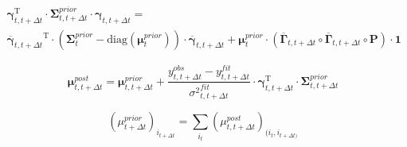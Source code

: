 \documentclass[pdflatex,sn-mathphys-num]{sn-jnl}%
\theoremstyle{thmstyleone}%
\theoremstyle{thmstyletwo}%
\theoremstyle{thmstylethree}%
\begin{document}
\begin{multline}
	{\mathbf \gamma}^{\mathrm{T}}_{t, t+\Delta t} \cdot \mathbf \Sigma^{prior}_{t, t+\Delta t} \cdot \mathbf \gamma_{t, t+\Delta t}= \\
	{\overline {\mathbf \gamma}_{t, t+\Delta t}}^\mathrm{T} \cdot 
	(\mathbf \Sigma^{prior}_{t} -\mathrm{diag}( \mathbf \mu^{prior}_t))\cdot  
	{\overline {\mathbf \gamma}_{t, t+\Delta t}}+ 
	\mathbf \mu^{prior}_t \cdot ( \overline {\mathbf \Gamma}_{t, t + \Delta t}  \circ  \overline {\mathbf \Gamma}_{t, t + \Delta t}  \circ \mathbf P ) \cdot \mathbf 1
\end{multline}

\begin{equation}
	\mathbf \mu^{post}_{t, t+ \Delta t}= \mathbf \mu^{prior}_{t, t+ \Delta t} + 
	{\frac {y^{obs}_{t, t+ \Delta t} - y^{fit}_{t, t+ \Delta t}}{{\sigma^2}^{fit}_{t, t+ \Delta t}} }
	\cdot {\mathbf \gamma}^\mathrm{T}_{t, t+ \Delta t} \cdot \mathbf \Sigma^{prior}_{t, t+ \Delta t} 
\end{equation}

\begin{equation}
	( \mu^{prior}_{t+ \Delta t})_{i_{t+\Delta t}} = \sum_{i_t} (\mu^{post}_{t, t+\Delta t})_{(i_t, i_{t+\Delta t)}}
\end{equation}
\begin{equation}
\end{equation}
\end{document}
